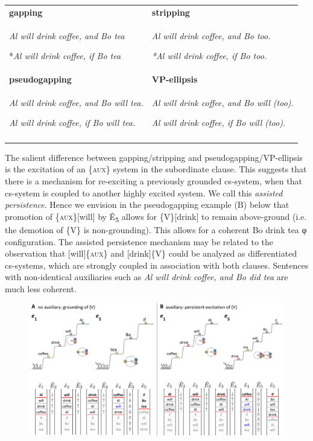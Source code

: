 \begin{tabularx}{\textwidth}{XX}
\lsptoprule
\textbf{gapping} & \textbf{stripping}\\
\textit{Al will drink coffee, and Bo tea}

*\textit{Al will drink coffee, if Bo tea} & \textit{Al will drink coffee, and Bo too.}

\textit{*Al will drink coffee, if Bo too.}  \\
\textbf{pseudogapping} & \textbf{VP-ellipsis}\\
\textit{Al will drink coffee, and Bo will tea.}

\textit{Al will drink coffee, if Bo will tea.} & \textit{Al will drink coffee, and Bo will (too).}

\textit{Al will drink coffee, if Bo will (too).}\\
\lspbottomrule
\end{tabularx}
  The salient difference between gapping/stripping and pseudogapping/VP-ellipsis is the excitation of an \{\textsc{aux}\} system in the subordinate clause. This suggests that there is a mechanism for re-exciting a previously grounded cs-system, when that cs-system is coupled to another highly excited system. We call this \textit{assisted persistence}. Hence we envision in the pseudogapping example (B) below that promotion of \{\textsc{aux}\}[will] by Ê\textsubscript{5} allows for \{V\}[drink] to remain above-ground (i.e. the demotion of \{V\} is non-grounding). This allows for a coherent {\textbar}Bo drink tea{\textbar} φ configuration. The assisted persistence mechanism may be related to the observation that [will]\{\textsc{aux}\} and [drink]\{V\} could be analyzed as differentiated cs-systems, which are strongly coupled in association with both clauses. Sentences with non-identical auxiliaries such as \textit{Al will drink coffee, and Bo did tea} are much less coherent.

  
\begin{figure}
\includegraphics[width=\textwidth]{figures/Tilsen-img147.png}
\caption{\missingcaption}
\label{fig:}
\end{figure}
 

